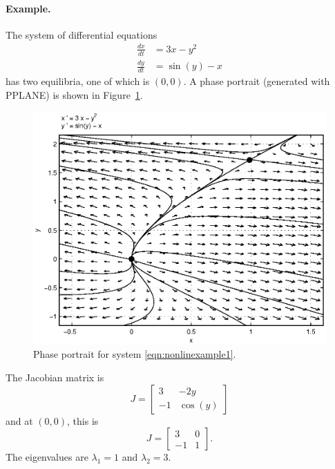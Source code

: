 \documentclass{book}
\begin{document}
\paragraph{Example.}
The system of differential equations
\begin{equation}
\begin{split}
   \frac{dx}{dt} & = 3x-y^2 \\
   \frac{dy}{dt} & = \sin(y)-x
\end{split}
\label{eqn:nonlinexample1}
\end{equation}
has two equilibria, one of which is  $(0,0)$.
A phase portrait (generated with PPLANE) is shown in
Figure~\ref{fig:nonlinexample1}.
\begin{figure}
\centerline{%
\includegraphics[width=5in]{pplane_plots/NonlinExample1.ps}
}
\caption{Phase portrait for system \eqref{eqn:nonlinexample1}.}
\label{fig:nonlinexample1}
\end{figure}
  The Jacobian matrix is
\begin{equation}
  J = \begin{bmatrix}
           3 &  -2y \\
	   -1 & \cos(y)
      \end{bmatrix}
\end{equation}
and at $(0,0)$, this is
\begin{equation}
  J = \begin{bmatrix}
           3 &  0 \\
	   -1 & 1
      \end{bmatrix}.
\end{equation}
The eigenvalues are $\lambda_1=1$ and $\lambda_2=3$.
\end{document}
